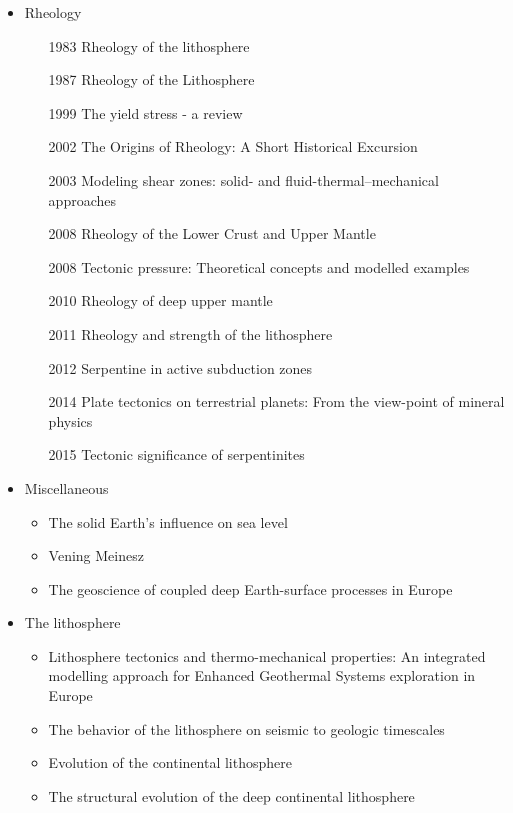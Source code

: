 \begin{itemize}
\item Rheology 
   \begin{itemize}
   \item [1983] Rheology of the lithosphere \cite{kirb83}
   \item [1987] Rheology of the Lithosphere \cite{kikr87}
   \item [1999] The yield stress - a review \cite{barn99}
   \item [2002] The Origins of Rheology: A Short Historical Excursion \cite{dora02}
   \item [2003] Modeling shear zones: solid- and fluid-thermal–mechanical approaches \cite{reyu03}
   \item [2008] Rheology of the Lower Crust and Upper Mantle \cite{budr08}
   \item [2008] Tectonic pressure: Theoretical concepts and modelled examples \cite{manc08}
   \item [2010] Rheology of deep upper mantle \cite{kara10}
   \item [2011] Rheology and strength of the lithosphere \cite{buro11}
   \item [2012] Serpentine in active subduction zones \cite{reyn12}
   \item [2014] Plate tectonics on terrestrial planets: From the view-point of mineral physics \cite{kara14}
   \item [2015] Tectonic significance of serpentinites \cite{gusr15}
   \end{itemize}

\item Miscellaneous
   \begin{itemize}
   \item The solid Earth’s influence on sea level \cite{conr13}  
   \item Vening Meinesz \cite{vlaa89}
   \item The geoscience of coupled deep Earth-surface processes in Europe \cite{clzb07}
   \end{itemize}

\item The lithosphere
   \begin{itemize}
   \item Lithosphere tectonics and thermo-mechanical properties: An integrated modelling
         approach for Enhanced Geothermal Systems exploration in Europe \cite{clvz10}
   \item The behavior of the lithosphere on seismic to geologic timescales \cite{wazh13}
   \item Evolution of the continental lithosphere \cite{slee05}
   \item The structural evolution of the deep continental lithosphere \cite{comm17}
   \end{itemize}


\end{itemize}
